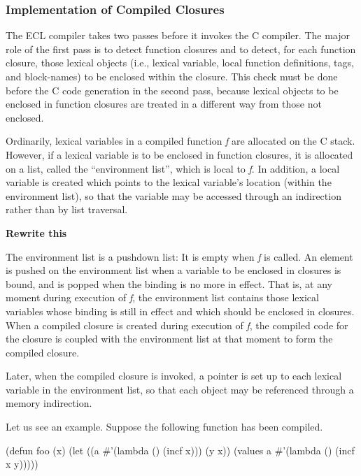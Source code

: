 \subsubsection{Implementation of Compiled Closures}
 
The ECL compiler takes two passes before it invokes the C
compiler.  The major role of the first pass is to detect function
closures and to detect, for each function closure, those lexical
objects (i.e., lexical variable, local function definitions, tags, and
block-names) to be enclosed within the closure.  This check must be
done before the C code generation in the second pass, because lexical
objects to be enclosed in function closures are treated in a different
way from those not enclosed.

Ordinarily, lexical variables in a compiled function {\em f}
are allocated on the C stack.  However, if a lexical variable is
to be enclosed in function closures, it is allocated on a list, called
the ``environment list'', which is local to {\em f}.  In addition, a
local variable is created which points to the lexical
variable's location (within the environment list), so that
the variable may be accessed through an indirection rather than by list
traversal.

\bf{Rewrite this}

The environment list is a pushdown list: It is empty when {\em f} is
called.  An element is pushed on the environment list when a variable
to be enclosed in closures is bound, and is popped when the binding is
no more in effect.  That is, at any moment during execution of {\em
f}, the environment list contains those lexical variables whose
binding is still in effect and which should be enclosed in closures.
When a compiled closure is created during execution of {\it f}, the
compiled code for the closure is coupled with the environment list at
that moment to form the compiled closure.

Later, when the compiled closure is invoked, a pointer is set up
to each lexical variable in the environment list, so that
each object may be referenced through a memory indirection.

Let us see an example.  Suppose the following function has been compiled.

\begin{example}
    (defun foo (x)
        (let ((a #'(lambda () (incf x)))
              (y x))
          (values a #'(lambda () (incf x y)))))
\end{example}

